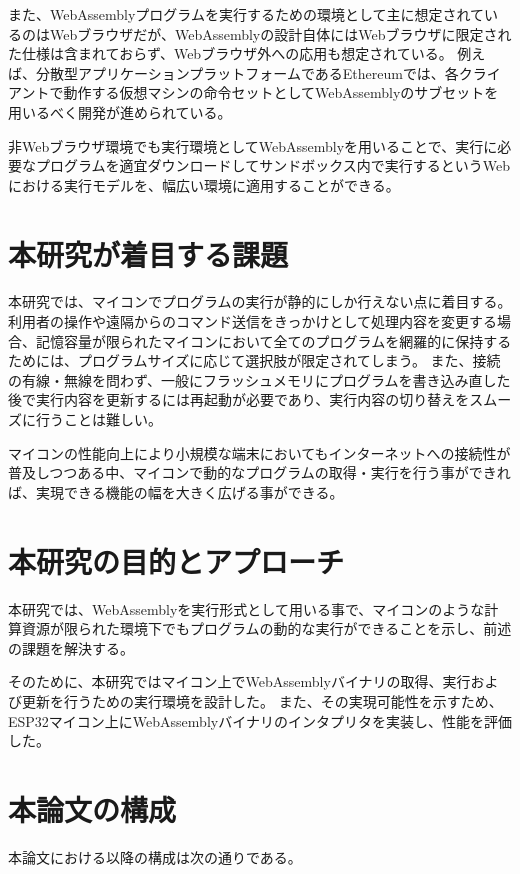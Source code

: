 また、WebAssemblyプログラムを実行するための環境として主に想定されているのはWebブラウザだが、WebAssemblyの設計自体にはWebブラウザに限定された仕様は含まれておらず、Webブラウザ外への応用も想定されている。
例えば、分散型アプリケーションプラットフォームであるEthereum\cite{ethereum}では、各クライアントで動作する仮想マシンの命令セットとしてWebAssemblyのサブセットを用いるべく開発が進められている\cite{ewasm}。

非Webブラウザ環境でも実行環境としてWebAssemblyを用いることで、実行に必要なプログラムを適宜ダウンロードしてサンドボックス内で実行するというWebにおける実行モデルを、幅広い環境に適用することができる。

\section{本研究が着目する課題}

本研究では、マイコンでプログラムの実行が静的にしか行えない点に着目する。
利用者の操作や遠隔からのコマンド送信をきっかけとして処理内容を変更する場合、記憶容量が限られたマイコンにおいて全てのプログラムを網羅的に保持するためには、プログラムサイズに応じて選択肢が限定されてしまう。
また、接続の有線・無線を問わず、一般にフラッシュメモリにプログラムを書き込み直した後で実行内容を更新するには再起動が必要であり、実行内容の切り替えをスムーズに行うことは難しい。

マイコンの性能向上により小規模な端末においてもインターネットへの接続性が普及しつつある中、マイコンで動的なプログラムの取得・実行を行う事ができれば、実現できる機能の幅を大きく広げる事ができる。

\section{本研究の目的とアプローチ}

本研究では、WebAssemblyを実行形式として用いる事で、マイコンのような計算資源が限られた環境下でもプログラムの動的な実行ができることを示し、前述の課題を解決する。

そのために、本研究ではマイコン上でWebAssemblyバイナリの取得、実行および更新を行うための実行環境を設計した。
また、その実現可能性を示すため、ESP32マイコン上にWebAssemblyバイナリのインタプリタを実装し、性能を評価した。

\section{本論文の構成}

本論文における以降の構成は次の通りである。

